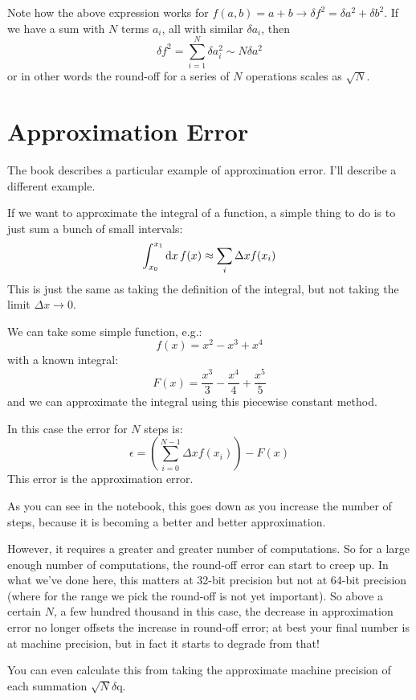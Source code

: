 Note how the above expression works for $f(a, b) = a +b \rightarrow
\delta f^2 = \delta a^2 + \delta b^2$. If we have a sum with $N$
terms $a_i$, all with similar $\delta a_i$, then
\begin{equation}
\delta f^2 = \sum_{i=1}^N \delta a_i^2 \sim N \delta a^2
\end{equation}
or in other words the round-off for a series of $N$ operations scales
as $\sqrt{N}$.

\section{Approximation Error}

The book describes a particular example of approximation error. I'll
describe a different example.

If we want to approximate the integral of a function, a simple thing
to do is to just sum a bunch of small intervals:
\begin{equation}
\int_{x_0}^{x_1} {\rm d}x\,f(x) \approx \sum_i \Delta x f(x_i)
\end{equation}
This is just the same as taking the definition of the integral, but
not taking the limit $\Delta x \rightarrow 0$. 

We can take some simple function, e.g.:
\begin{equation}
f(x) = x^2 - x^3 + x^4
\end{equation}
with a known integral:
\begin{equation}
F(x) = \frac{x^3}{3} - \frac{x^4}{4} + \frac{x^5}{5}
\end{equation}
and we can approximate the integral using this piecewise constant
method.

In this case the error for $N$ steps is:
\begin{equation}
\epsilon = \left(\sum_{i=0}^{N-1} \Delta x f(x_i) \right) - F(x)
\end{equation}
This error is the approximation error. 

As you can see in the notebook, this goes down as you increase the
number of steps, because it is becoming a better and better
approximation.

However, it requires a greater and greater number of computations. So
for a large enough number of computations, the round-off error can
start to creep up. In what we've done here, this matters at 32-bit
precision but not at 64-bit precision (where for the range we pick the
round-off is not yet important). So above a certain $N$, a few hundred
thousand in this case, the decrease in approximation error no longer
offsets the increase in round-off error; at best your final number is
at machine precision, but in fact it starts to degrade from that!

You can even calculate this from taking the approximate machine
precision of each summation $\sqrt{N}\delta$q. 

